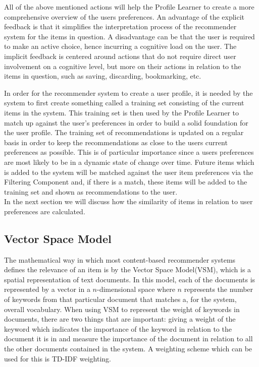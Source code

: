 All of the above mentioned actions will help the Profile Learner to create a more comprehensive overview of the users preferences. An advantage of the explicit feedback is that it simplifies the interpretation process of the recommender system for the items in question. A disadvantage can be that the user is required to make an active choice, hence incurring a cognitive load on the user. The implicit feedback is centered around actions that do not require direct user involvement on a cognitive level, but more on their actions in relation to the items in question, such as saving, discarding, bookmarking, etc.\newline

In order for the recommender system to create a user profile, it is needed by the system to first create something called a training set consisting of the current items in the system. This training set is then used by the Profile Learner to match up against the user's preferences in order to build a solid foundation for the user profile. The training set of recommendations is updated on a regular basis in order to keep the recommendations as close to the users current preferences as possible. This is of particular importance since a users preferences are most likely to be in a dynamic state of change over time. Future items which is added to the system will be matched against the user item preferences via the Filtering Component and, if there is a match, these items will be added to the training set and shown as recommendations to the user. \\
In the next section we will discuss how the similarity of items in relation to user preferences are calculated.

\subsection{Vector Space Model}
The mathematical way in which most content-based recommender systems defines the relevance of an item is by the Vector Space Model(VSM), which is a spatial representation of text documents. In this model, each of the documents is represented by a vector in a \(n\)-dimensional space where \(n\) represents the number of keywords from that particular document that matches a, for the system, overall vocabulary.\newline
When using VSM to represent the weight of keywords in documents, there are two things that are important: giving a weight of the keyword which indicates the importance of the keyword in relation to the document it is in and measure the importance of the document in relation to all the other documents contained in the system. A weighting scheme which can be used for this is TD-IDF weighting. \newline

